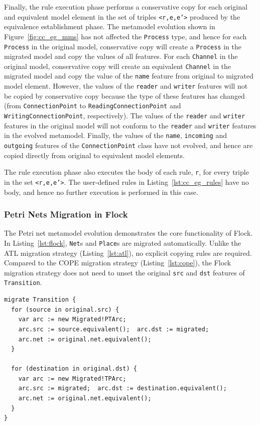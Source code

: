 Finally, the rule execution phase performs a conservative copy for each original and equivalent model element in the set of triples \texttt{<r,e,e'>} produced by the equivalence establishment phase. The metamodel evolution shown in Figure~\ref{fig:cc_eg_mms} has not affected the \texttt{Pr\-oc\-e\-ss} type, and hence for each \texttt{Pr\-oc\-e\-ss} in the original model, conservative copy will create a \texttt{Pr\-oc\-e\-ss} in the migrated model and copy the values of all features. For each \texttt{Ch\-an\-n\-el} in the original model, conservative copy will create an equivalent \texttt{Ch\-an\-n\-el} in the migrated model and copy the value of the \texttt{na\-me} feature from original to migrated model element. However, the values of the \texttt{re\-ad\-er} and \texttt{wr\-it\-er} features will not be copied by conservative copy because the type of these features has changed (from \texttt{Co\-nn\-ec\-ti\-o\-nP\-oi\-nt} to \texttt{Re\-a\-di\-ngCo\-nn\-ec\-ti\-o\-nP\-oi\-nt} and \texttt{Wr\-i\-ti\-ngCo\-nn\-ec\-ti\-o\-nP\-oi\-nt}, respectively). The values of the \texttt{re\-ad\-er} and \texttt{wr\-it\-er} features in the original model will not conform to the \texttt{re\-ad\-er} and \texttt{wr\-it\-er} features in the evolved metamodel. Finally, the values of the \texttt{na\-me}, \texttt{in\-co\-mi\-ng} and \texttt{ou\-tg\-oi\-ng} features of the \texttt{Co\-nn\-ec\-ti\-o\-nP\-oi\-nt} class have not evolved, and hence are copied directly from original to equivalent model elements.

The rule execution phase also executes the body of each rule, \texttt{r}, for every triple in the set \texttt{<r,e,e'>}. The user-defined rules in Listing~\ref{lst:cc_eg_rules} have no body, and hence no further execution is performed in this case.

\subsubsection{Petri Nets Migration in Flock}
The Petri net metamodel evolution demonstrates the core functionality of Flock. In Listing~\ref{lst:flock}, \texttt{Net}s and \texttt{Place}s are migrated automatically. Unlike the ATL migration strategy (Listing~\ref{lst:atl}), no explicit copying rules are required. Compared to the COPE migration strategy (Listing~\ref{lst:cope}), the Flock migration strategy does not need to unset the original \texttt{src} and \texttt{dst} features of \texttt{Transition}.

\begin{lstlisting}[caption=Petri nets model migration in Flock, label=lst:flock, language=Flock]
migrate Transition {
  for (source in original.src) {
    var arc := new Migrated!PTArc;
    arc.src := source.equivalent();  arc.dst := migrated;
    arc.net := original.net.equivalent();
  }

  for (destination in original.dst) {
    var arc := new Migrated!TPArc;
    arc.src := migrated;  arc.dst := destination.equivalent();
    arc.net := original.net.equivalent();
  }
}
\end{lstlisting}

